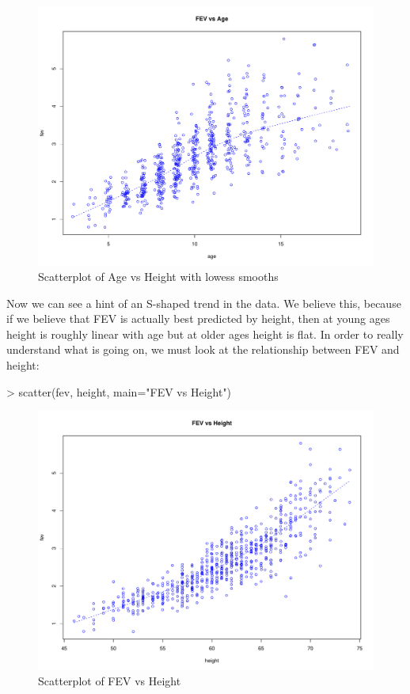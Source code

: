 \documentclass[landscape]{article}
\renewenvironment{Schunk}{\vspace{\topsep}}{\vspace{\topsep}}
\begin{document}
\begin{figure}[h]
\centering
\includegraphics[scale=.005]{fevdoc-agefevscatter2}
\caption{Scatterplot of Age vs Height with lowess smooths}
\label{agefevscatter2}
\end{figure}
Now we can see a hint of an S-shaped trend in the data. We believe this, because if we believe that FEV is actually best predicted by height, then at young ages height is roughly linear with age but at older ages height is flat. In order to really understand what is going on, we must look at the relationship between FEV and height:\\
\begin{Schunk}
\begin{Sinput}
> scatter(fev, height, main="FEV vs Height")
\end{Sinput}
\end{Schunk}
\begin{figure}[h]
\centering
\includegraphics[scale=.005]{fevdoc-heightfevscatter1}
\caption{Scatterplot of FEV vs Height}
\label{heightfevscatter1}
\end{figure}
\end{document}
